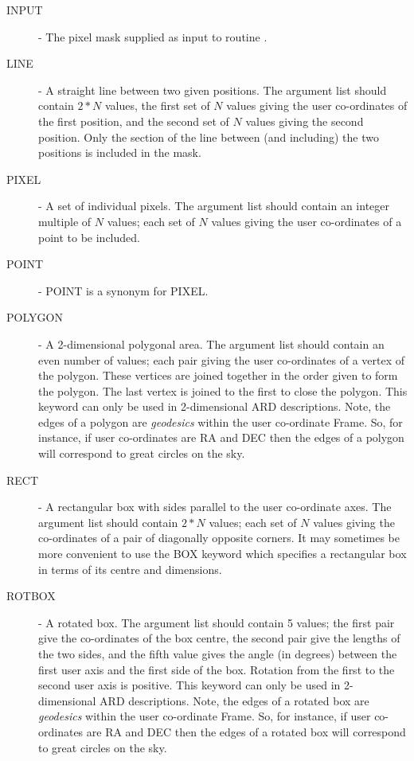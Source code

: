 \begin{description}
\item [\label{KEY:INP}INPUT] - The pixel mask supplied as input to routine 
. 

\item [\label{KEY:LIN}LINE] - A straight line between two given positions. 
The argument list should contain $2*N$ values, the first set of $N$
values giving the user co-ordinates of the first position, and the second set
of $N$ values giving the second position. Only the section of the line
between (and including) the two positions is included in the mask.

\item [\label{KEY:PIX}PIXEL] - A set of individual pixels. The argument list 
should contain an integer multiple of $N$ values; each set of $N$ values 
giving the user co-ordinates of a point to be included.

\item [\label{KEY:POI}POINT] - POINT is a synonym for PIXEL. 

\item [\label{KEY:POL}POLYGON] - A 2-dimensional polygonal area. The argument 
list should contain an even number of values; each pair giving the
user co-ordinates of a vertex of the polygon. These vertices are joined
together in the order given to form the polygon. The last vertex is
joined to the first to close the polygon. This keyword can only be used
in 2-dimensional ARD descriptions. Note, the edges of a polygon are {\em 
geodesics} within the user co-ordinate Frame. So, for instance, if user 
co-ordinates are RA and DEC then the edges of a polygon will correspond to 
great circles on the sky.

\item [\label{KEY:REC}RECT] - A rectangular box with sides parallel to the 
user co-ordinate axes. The argument list should contain $2*N$ values;
each set of $N$ values giving the co-ordinates of a pair of diagonally
opposite corners. It may sometimes be more convenient to use the BOX
keyword which specifies a rectangular box in terms of its centre and
dimensions.

\item [\label{KEY:ROT}ROTBOX] - A rotated box. The argument list should 
contain 5 values; the first pair give the co-ordinates of the box centre,
the second pair give the lengths of the two sides, and the fifth value
gives the angle (in degrees) between the first user axis and the first side 
of the box. Rotation from the first to the second user axis is positive. This 
keyword can only be used in 2-dimensional ARD descriptions. Note, the
edges of a rotated box are {\em geodesics} within the user co-ordinate
Frame. So, for instance, if user co-ordinates are RA and DEC then the
edges of a rotated box will correspond to great circles on the sky.


\end{description}
